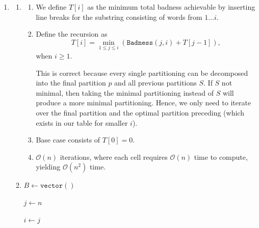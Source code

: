 \documentclass[12pt]{article}
\begin{document}
\begin{enumerate}
\begin{enumerate}
      \item We have $\mathcal O(nk)$ cells that each require
        $\mathcal O(1)$ time to compute, meaning our algorithm runs
        in $\mathcal O(nk)$ time.
    \end{enumerate}

  \item
    \begin{enumerate}
      \item
        \begin{enumerate}
          \item We define $T[i]$ as the minimum total badness
            achievable by inserting line breaks for the substring
            consisting of words from $1 \ldots i.$

          \item Define the recursion as
            $$
            T[i] = \min_{1 \leq j \leq i}(\texttt{Badness}(j, i) + T[j - 1]),
            $$
            when $i \geq 1.$

            This is correct because every single partitioning can be
            decomposed into the final partition $p$ and all previous
            partitions $S$. If $S$ not minimal, then taking the
            minimal partitioning instead of $S$ will produce a more
            minimal partitioning. Hence, we only need to iterate over
            the final partition and the optimal partition preceding
            (which exists in our table for smaller $i$).

          \item Base case consists of $T[0] = 0.$

          \item $\mathcal O(n)$ iterations, where each cell requires
            $\mathcal O(n)$ time to compute, yielding $\mathcal O(n^2)$ time.
        \end{enumerate}

      \item
        \begin{algorithm}
          \begin{algorithmic}
            \State $B \gets \texttt{vector}()$

            \State $j \gets n$

            \vspace{3mm}

            \State $i \gets j$

            \vspace{3mm}


\end{algorithmic}
\end{algorithm}
\end{enumerate}
\end{enumerate}
\end{document}
